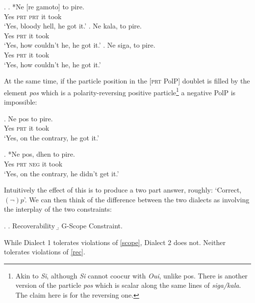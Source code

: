 \documentclass[output=paper]{LSP/langsci}
\begin{document}
\Lsciex.
\ag. 
*Ne [re gamoto]  to pire.\\
Yes \textsc{prt} \textsc{prt}  it took\\ \label{nq7}
\glt `Yes, bloody hell, he got it.'
\bg. 
Ne kala,   to pire.\\
Yes \textsc{prt}   it took\\ \label{nq8}
\glt `Yes, how couldn't he, he got it.'
\cg. 
Ne siga,  to pire.\\
Yes \textsc{prt}  it took\\ \label{nq9}
\glt `Yes, how couldn't he, he got it.'


At the same time, if the particle  position in the [\textsc{prt} PolP] doublet is filled by the element \textit{pos} which is a polarity-reversing positive particle\footnote{Akin to  \textit{Si}, although \textit{Si} cannot coocur with \textit{Oui}, unlike pos. There is another version of the particle \textit{pos} which is scalar along the same lines of \textit{siga/kala}.  The claim here is for the  reversing one.} a negative PolP is impossible:

\exg. 
Ne pos  to pire.\\
Yes \textsc{prt} it took\\ \label{nq10}
\glt `Yes, on the contrary, he got it.'
 
\exg. 
*Ne pos,  dhen to pire.\\
Yes \textsc{prt} \textsc{neg} it took\\ \label{nq11}
\glt `Yes, on the contrary, he didn't get it.'

Intuitively the effect of this is to produce a two part answer, roughly:  `Correct, $(\neg) p$'.
We can then think of the difference between the two dialects as involving the interplay  of the two constraints: 

\Lsciex.
\a. Recoverability \label{rec}
\b. G-Scope Constraint. \label{scope}

While Dialect 1 tolerates violations of \ref{scope}, Dialect 2 does not.  Neither tolerates violations of \ref{rec}.

 
\end{document}
